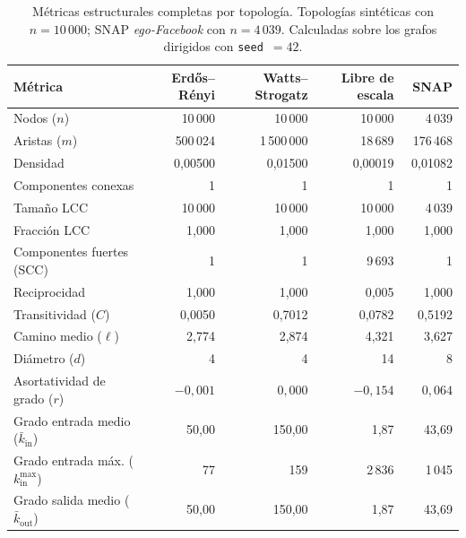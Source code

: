 \documentclass[12pt]{extarticle}
\numberwithin{equation}{section}
\begin{document}
\begin{table}[H]
  \centering
  \small
  \caption{Métricas estructurales completas por topología. Topologías sintéticas con $n=10\,000$; SNAP \emph{ego-Facebook} con $n=4\,039$. Calculadas sobre los grafos dirigidos con \texttt{seed}~$=42$.}
  \label{tab:anexo-metricas}
  \begin{tabular}{@{}l r r r r@{}}
    \toprule
    \textbf{Métrica} & \textbf{Erdős–Rényi} & \textbf{Watts–Strogatz} & \textbf{Libre de escala} & \textbf{SNAP} \\
    \midrule
    Nodos ($n$)                          & 10\,000   & 10\,000     & 10\,000   & 4\,039 \\
    Aristas ($m$)                        & 500\,024  & 1\,500\,000 & 18\,689   & 176\,468 \\
    Densidad                             & 0{,}00500 & 0{,}01500   & 0{,}00019 & 0{,}01082 \\
    \addlinespace
    Componentes conexas                  & 1         & 1           & 1         & 1 \\
    Tamaño LCC                           & 10\,000   & 10\,000     & 10\,000   & 4\,039 \\
    Fracción LCC                         & 1{,}000   & 1{,}000     & 1{,}000   & 1{,}000 \\
    Componentes fuertes (SCC)            & 1         & 1           & 9\,693    & 1 \\
    Reciprocidad                         & 1{,}000   & 1{,}000     & 0{,}005   & 1{,}000 \\
    \addlinespace
    Transitividad ($C$)                  & 0{,}0050  & 0{,}7012    & 0{,}0782  & 0{,}5192 \\
    Camino medio ($\ell$)                & 2{,}774   & 2{,}874     & 4{,}321   & 3{,}627 \\
    Diámetro ($d$)                       & 4         & 4           & 14        & 8 \\
    Asortatividad de grado ($r$)         & $-0{,}001$ & $\phantom{-}0{,}000$ & $-0{,}154$ & $\phantom{-}0{,}064$ \\
    \addlinespace
    Grado entrada medio ($\bar{k}_{\mathrm{in}}$) & 50{,}00 & 150{,}00 & 1{,}87 & 43{,}69 \\
    Grado entrada máx. ($k_{\mathrm{in}}^{\max}$) & 77      & 159      & 2\,836 & 1\,045 \\
    Grado salida medio ($\bar{k}_{\mathrm{out}}$) & 50{,}00 & 150{,}00 & 1{,}87 & 43{,}69 \\

\end{tabular}
\end{table}
\end{document}
